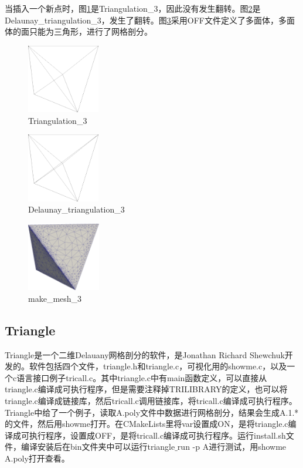 当插入一个新点时，图\ref{fig:1-5}是Triangulation\_3，因此没有发生翻转。图\ref{fig:1-6}是Delaunay\_triangulation\_3，发生了翻转。图\ref{fig:1-7}采用OFF文件定义了多面体，多面体的面只能为三角形，进行了网格剖分。
\begin{figure}[!htbp]
  \centering
  \includegraphics[height=3cm]{fig/1/5.png}
  \caption{Triangulation\_3}
  \label{fig:1-5}
\end{figure}
\begin{figure}[!htbp]
  \centering
  \includegraphics[height=3cm]{fig/1/6.png}
  \caption{Delaunay\_triangulation\_3}
  \label{fig:1-6}
\end{figure}
\begin{figure}[!htbp]
  \centering
  \includegraphics[height=3cm]{fig/1/7.png}
  \caption{make\_mesh\_3}
  \label{fig:1-7}
\end{figure}


\subsection{Triangle}

Triangle是一个二维Delauany网格剖分的软件，是Jonathan Richard Shewchuk开发的。软件包括四个文件，triangle.h和triangle.c，可视化用的showme.c，以及一个c语言接口例子tricall.c。其中triangle.c中有main函数定义，可以直接从triangle.c编译成可执行程序，但是需要注释掉TRILIBRARY的定义，也可以将triangle.c编译成链接库，然后tricall.c调用链接库，将tricall.c编译成可执行程序。Triangle中给了一个例子，读取A.poly文件中数据进行网格剖分，结果会生成A.1.*的文件，然后用showme打开。在CMakeLists里将var设置成ON，是将triangle.c编译成可执行程序，设置成OFF，是将tricall.c编译成可执行程序。运行install.sh文件，编译安装后在bin文件夹中可以运行triangle$\_$run -p A进行测试，用showme A.poly打开查看。


